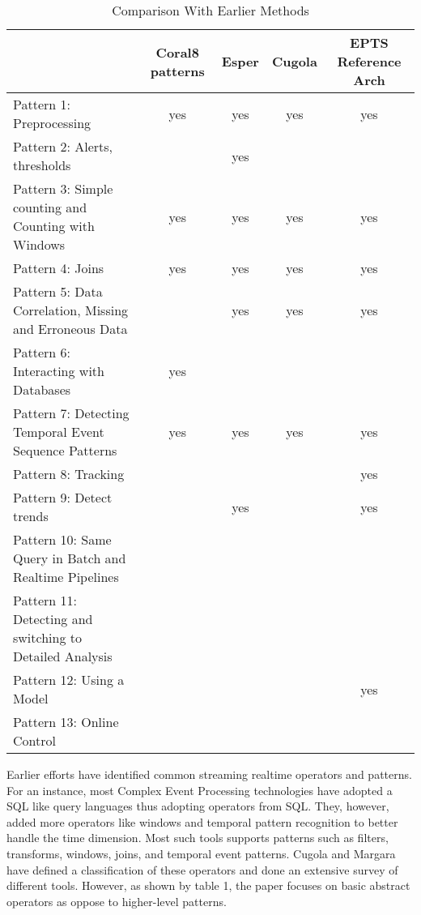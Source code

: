 \documentclass{sig-alternate}
\begin{document}
{\renewcommand{\arraystretch}{1.8}
\begin{table*}[htbp]
\begin{center}
\caption{Comparison With Earlier Methods}
\label{table:datasets}
\begin{tabular}{| l | c | c | c | c |}
\hline
& Coral8 patterns & Esper	& Cugola	& EPTS Reference Arch \\ \hline
Pattern 1: Preprocessing &	yes &	yes &	yes &	yes \\ \hline
Pattern 2: Alerts, thresholds & & yes &  & \\ \hline		
Pattern 3: Simple counting and Counting with Windows & 	yes &	yes &	yes &	yes \\ \hline
Pattern 4: Joins &	yes &	yes &	yes	& yes \\ \hline
Pattern 5: Data Correlation, Missing and Erroneous Data & & yes	& yes	& yes \\ \hline
Pattern 6: Interacting with Databases & yes & & &		\\ \hline
Pattern 7: Detecting Temporal Event Sequence Patterns &	yes & yes & yes	& yes \\ \hline
Pattern 8: Tracking & & & &	yes \\ \hline
Pattern 9: Detect trends &  & yes	& &	yes \\ \hline
Pattern 10: Same Query in Batch and Realtime Pipelines & & & &\\ \hline
Pattern 11: Detecting and switching to Detailed Analysis & & & & \\ \hline
Pattern 12: Using a Model & & & &		yes \\ \hline
Pattern 13: Online Control & & & & \\ \hline
\end{tabular}
\end{center}
\end{table*}

Earlier efforts have identified common streaming realtime operators and patterns. For an instance, most Complex Event Processing technologies have adopted a SQL like query languages thus adopting operators from SQL. They, however, added more operators like windows and temporal pattern recognition to better handle the time dimension. Most such tools supports patterns such as filters, transforms, windows, joins, and temporal event patterns. Cugola and Margara~\cite{cugolaprocessing} have defined a classification of these operators and done an extensive survey of different tools. However, as shown by table 1, the paper focuses on basic abstract operators as oppose to higher-level patterns. 

}
\end{document}
